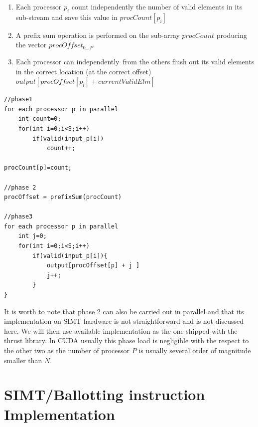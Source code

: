 \begin{enumerate}
	\item Each processor \(p_i\) count independently the number of valid elements in its sub-stream and save this value in \(procCount[p_i]\)
	\item A prefix sum operation is performed on the sub-array \(procCount\) producing the vector \(procOffset_{0\ldots P}\)
	\item Each processor can independently from the others flush out its valid elements in the correct location (at the correct offset) \(output[procOffset[p_i]+currentValidElm]\)
\end{enumerate}
\begin{lstlisting}
//phase1
for each processor p in parallel
	int count=0;
	for(int i=0;i<S;i++)
		if(valid(input_p[i])
			count++;

procCount[p]=count;

//phase 2
procOffset = prefixSum(procCount)

//phase3
for each processor p in parallel
	int j=0;
	for(int i=0;i<S;i++)
		if(valid(input_p[i]){
			output[procOffset[p] + j ]
			j++;
		}
}	
\end{lstlisting}

It is worth to note that phase $2$ can also be carried out in parallel and that its implementation on SIMT hardware is not straightforward and is not discussed here. We will then use available implementation as the one shipped with the thrust library. In CUDA usually this phase load is negligible with the respect to the other two as the number of processor $P$ is usually several order of magnitude smaller than $N$.

\section{SIMT/Ballotting instruction Implementation}
